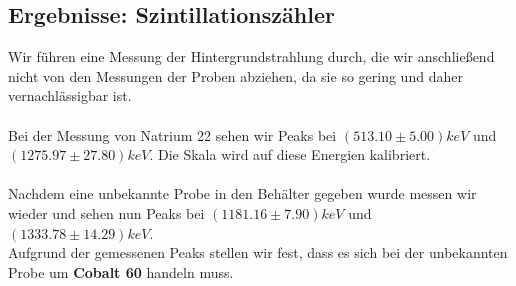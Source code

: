 \documentclass{article}
\begin{document}
\subsection{Ergebnisse: Szintillationszähler}
Wir führen eine Messung der Hintergrundstrahlung durch, die wir anschließend nicht von den Messungen der Proben abziehen, da sie so gering und daher vernachlässigbar ist.\\
\\
Bei der Messung von Natrium 22 sehen wir Peaks bei $(513.10 \pm 5.00)\si{keV}$ und $(1275.97 \pm 27.80)\si{keV}$. Die Skala wird auf diese Energien kalibriert.\\
\\
Nachdem eine unbekannte Probe in den Behälter gegeben wurde messen wir wieder und sehen nun Peaks bei $(1181.16 \pm 7.90)\si{keV}$ und $(1333.78 \pm 14.29)\si{keV}$.\\
Aufgrund der gemessenen Peaks stellen wir fest, dass es sich bei der unbekannten Probe um \textbf{Cobalt 60} handeln muss.
\end{document}
